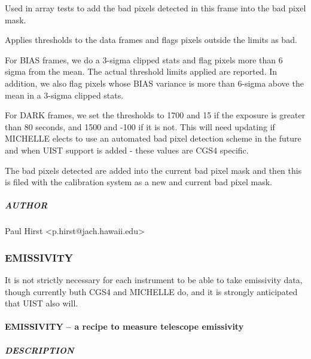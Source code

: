 \documentclass[twoside,11pt]{article}
\renewcommand{\_}{\texttt{\symbol{95}}}
\begin{document}
Used in array tests to add the bad pixels detected in this frame into the 
bad pixel mask.



Applies thresholds to the data frames and flags pixels outside
the limits as bad.



For BIAS frames, we do a 3-sigma clipped stats and flag pixels more
than 6 sigma from the mean. The actual threshold limits applied are
reported. In addition, we also flag pixels whose BIAS variance is more
than 6-sigma above the mean in a 3-sigma clipped stats.



For DARK frames, we set the thresholds to 1700 and 15 if the exposure
is greater than 80 seconds, and 1500 and -100 if it is not. This will
need updating if MICHELLE elects to use an automated bad pixel
detection scheme in the future and when UIST support is added - these
values are CGS4 specific.



The bad pixels detected are added into the current bad pixel mask and
then this is filed with the calibration system as a new and current
bad pixel mask.

\subparagraph*{AUTHOR\label{_FIND_BAD_PIXELS_--_Finds_bad_pixels_in_a_frame_AUTHOR}}

Paul Hirst <p.hirst@jach.hawaii.edu>


\subsubsection{EMISSIVITY}

It is not strictly necessary for each instrument to be able to take
emissivity data, though currently buth CGS4 and MICHELLE do, and it is
strongly anticipated that UIST also will.

\paragraph*{EMISSIVITY -- a recipe to measure telescope emissivity\label{EMISSIVITY_--_a_recipe_to_measure_telescope_emissivity}}



\subparagraph*{DESCRIPTION\label{EMISSIVITY_--_a_recipe_to_measure_telescope_emissivity_DESCRIPTION}}
\end{document}
